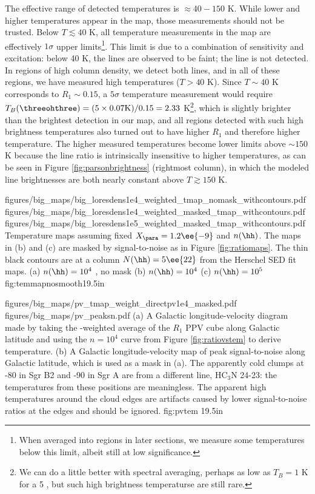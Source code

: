 The effective range of detected temperatures is $\approx40-150$ K. While lower
and higher temperatures appear in the map, those measurements should not be
trusted.  Below $T\lesssim40$ K, all temperature measurements in the map are
effectively $1\sigma$ upper limits\footnote{When averaged into regions in later
sections, we measure some temperatures below this limit, albeit still at low
significance.}.  This
limit is due to a combination of sensitivity and excitation: below 40 K, the
\para lines are observed to be faint; the \threetwoone line is not detected.
In regions of high column density, we detect both lines, and in all of these
regions, we have measured high temperatures ($T>40$ K).  
Since $T\sim40$ K corresponds to $R_1\sim0.15$, a $5\sigma$ temperature
measurement would require $T_B(\threeohthree) = (5 \times 0.07 \mathrm{K}) /
0.15 = 2.33$ K\footnote{We can do a little better with spectral averaging,
perhaps as low as $T_B=1$ K for a 5 \kms, but such high brightness temperaturse
are still rare.}, which is slightly brighter than the brightest detection in our map,
and all regions detected with such high brightness
temperatures also turned out to have higher $R_1$ and therefore higher
temperature.
The higher measured temperatures
become lower limits above $\sim150$ K because the \para line ratio is
intrinsically insensitive to higher temperatures, as can be seen in Figure
\ref{fig:parsonbrightness} (rightmost column), in which the modeled line
brightnesses are both nearly constant above $T\gtrsim150$ K.


\RotFigureThreeAA
{figures/big_maps/big_loresdens1e4_weighted_tmap_nomask_withcontours.pdf}
{figures/big_maps/big_loresdens1e4_weighted_masked_tmap_withcontours.pdf}
{figures/big_maps/big_loresdens1e5_weighted_masked_tmap_withcontours.pdf}
{Temperature maps assuming fixed $X_{\para}=1.2\ee{-9}$
and $n(\hh)$.  The maps in (b) and (c) are masked by signal-to-noise as in
Figure \ref{fig:ratiomaps}.  The thin black contours are at a column
$N(\hh)=5\ee{22}$ \percc
from the Herschel SED fit maps.
(a) $n(\hh) = 10^4$ \percc, no mask
(b) $n(\hh) = 10^4$ \percc
(c) $n(\hh) = 10^5$ \percc
}
{fig:temmapnosmooth}{1}{9.5in}





\RotFigureTwoAA
{figures/big_maps/pv_tmap_weight_directpv1e4_masked.pdf}
{figures/big_maps/pv_peaksn.pdf}
{(a) A Galactic longitude-velocity diagram made by taking the
\threeohthree-weighted average of the $R_1$ PPV cube along Galactic latitude
and using the $n=10^4$ \percc curve
from Figure \ref{fig:ratiovstem} to derive temperature.  (b) A Galactic
longitude-velocity map of peak
signal-to-noise along Galactic latitude, which is used as a mask in (a).  The
apparently cold clumps at -80 \kms in Sgr
B2 and -90 \kms in Sgr A are from a different line, HC$_3$N 24-23: the
temperatures from these positions are meaningless.
The apparent high temperatures around the cloud edges are artifacts caused by
lower signal-to-noise ratios at the edges and should be ignored.
}
{fig:pvtem}
{1}{9.5in}


